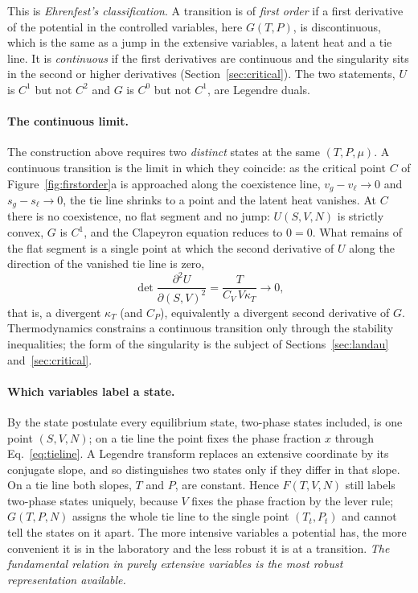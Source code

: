 \documentclass[10pt,a4paper]{article}
\theoremstyle{remark}
\begin{document}
This is \emph{Ehrenfest's classification}. A transition is of \emph{first
order} if a first derivative of the potential in the controlled variables,
here $G(T,P)$, is discontinuous, which is the same as a jump in the extensive
variables, a latent heat and a tie line. It is \emph{continuous} if the first
derivatives are continuous and the singularity sits in the second or higher
derivatives (Section~\ref{sec:critical}). The two statements, $U$ is $C^{1}$
but not $C^{2}$ and $G$ is $C^{0}$ but not $C^{1}$, are Legendre duals.

\paragraph{The continuous limit.} The construction above requires two
\emph{distinct} states at the same $(T,P,\mu)$. A continuous transition is the
limit in which they coincide: as the critical point $C$ of
Figure~\ref{fig:firstorder}a is approached along the coexistence line,
$v_g-v_\ell\to0$ and $s_g-s_\ell\to0$, the tie line shrinks to a point and the
latent heat vanishes. At $C$ there is no coexistence, no flat segment and no
jump: $U(S,V,N)$ is strictly convex, $G$ is $C^{1}$, and the Clapeyron
equation reduces to $0=0$. What remains of the flat segment is a single
point at which the second derivative of $U$ along the direction of the
vanished tie line is zero,
\[
  \det\frac{\partial^{2}U}{\partial(S,V)^{2}}=\frac{T}{C_V\,V\kappa_T}\to0 ,
\]
that is, a divergent $\kappa_T$ (and $C_P$), equivalently a divergent second
derivative of $G$. Thermodynamics constrains a continuous transition only
through the stability inequalities; the form of the singularity is the subject
of Sections~\ref{sec:landau} and~\ref{sec:critical}.

\paragraph{Which variables label a state.} By the state postulate every equilibrium
state, two-phase states included, is one point $(S,V,N)$; on a tie line the
point fixes the phase fraction $x$ through Eq.~\eqref{eq:tieline}. A Legendre
transform replaces an extensive coordinate by its conjugate slope, and so
distinguishes two states only if they differ in that slope. On a tie line
both slopes, $T$ and $P$, are constant. Hence
$F(T,V,N)$ still labels two-phase states uniquely, because $V$ fixes the phase fraction by the
lever rule; $G(T,P,N)$ assigns the whole tie line to the single point
$(T_t,P_t)$ and cannot tell the states on it apart. The more intensive
variables a potential has, the more convenient it is in the laboratory and the
less robust it is at a transition. \emph{The fundamental relation in purely
extensive variables is the most robust representation available.}
\end{document}
